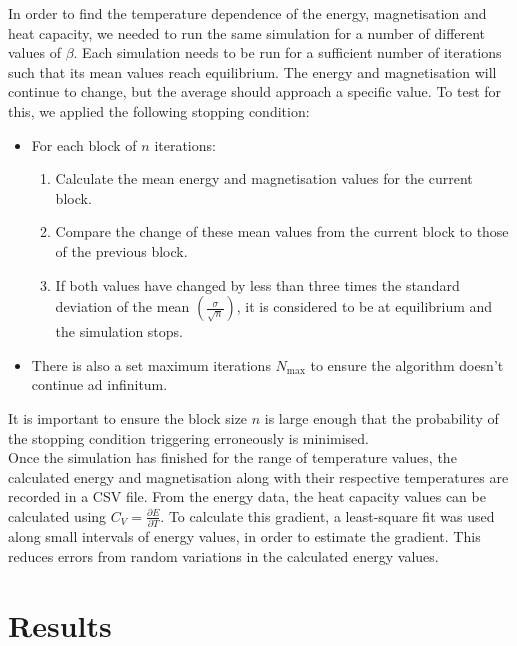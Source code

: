 \documentclass[11pt]{article}
\begin{document}
	In order to find the temperature dependence of the energy, magnetisation and heat capacity, we needed to run the same simulation for a number of different values of $\beta$. Each simulation needs to be run for a sufficient number of iterations such that its mean values reach equilibrium. The energy and magnetisation will continue to change, but the average should approach a specific value. To test for this, we applied the following stopping condition:
	\begin{itemize}
		\item For each block of $n$ iterations:
		\begin{enumerate}
			\item Calculate the mean energy and magnetisation values for the current block.
			\item Compare the change of these mean values from the current block to those of the previous block.
			\item If both values have changed by less than three times the standard deviation of the mean $\displaystyle\left(\frac{\sigma}{\sqrt{n}}\right)$, it is considered to be at equilibrium and the simulation stops.
		\end{enumerate}
		\item There is also a set maximum iterations $N_\text{max}$ to ensure the algorithm doesn't continue ad infinitum.
	\end{itemize}
	It is important to ensure the block size $n$ is large enough that the probability of the stopping condition triggering erroneously is minimised. \\
	
	Once the simulation has finished for the range of temperature values, the calculated energy and magnetisation along with their respective temperatures are recorded in a CSV file. From the energy data, the heat capacity values can be calculated using $C_V = \frac{\partial E}{\partial T}$. To calculate this gradient, a least-square fit was used along small intervals of energy values, in order to estimate the gradient. This reduces errors from random variations in the calculated energy values.
	
	\section{Results}
	
\end{document}
